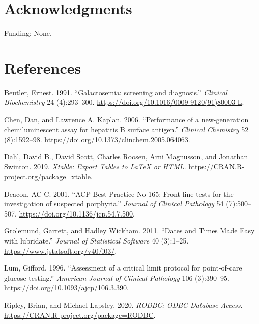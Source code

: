 \documentclass[review]{elsarticle}
\begin{document}
\section*{Acknowledgments}
\label{sec:orgf76cac3}
Funding: None.
\section*{References}
\label{sec:orgbd3db18}
\begin{hangparas}{1.5em}{1}
\hypertarget{citeproc_bib_item_1}{Beutler, Ernest. 1991. “Galactosemia: screening and diagnosis.” \textit{Clinical Biochemistry} 24 (4):293–300. \href{https://doi.org/10.1016/0009-9120(91)80003-L}{https://doi.org/10.1016/0009-9120(91)80003-L}.}

\hypertarget{citeproc_bib_item_2}{Chen, Dan, and Lawrence A. Kaplan. 2006. “Performance of a new-generation chemiluminescent assay for hepatitis B surface antigen.” \textit{Clinical Chemistry} 52 (8):1592–98. \href{https://doi.org/10.1373/clinchem.2005.064063}{https://doi.org/10.1373/clinchem.2005.064063}.}

\hypertarget{citeproc_bib_item_3}{Dahl, David B., David Scott, Charles Roosen, Arni Magnusson, and Jonathan Swinton. 2019. \textit{Xtable: Export Tables to LaTeX or HTML}. \href{https://CRAN.R-project.org/package=xtable}{https://CRAN.R-project.org/package=xtable}.}

\hypertarget{citeproc_bib_item_4}{Deacon, AC C. 2001. “ACP Best Practice No 165: Front line tests for the investigation of suspected porphyria.” \textit{Journal of Clinical Pathology} 54 (7):500–507. \href{https://doi.org/10.1136/jcp.54.7.500}{https://doi.org/10.1136/jcp.54.7.500}.}

\hypertarget{citeproc_bib_item_5}{Grolemund, Garrett, and Hadley Wickham. 2011. “Dates and Times Made Easy with lubridate.” \textit{Journal of Statistical Software} 40 (3):1–25. \href{https://www.jstatsoft.org/v40/i03/}{https://www.jstatsoft.org/v40/i03/}.}

\hypertarget{citeproc_bib_item_6}{Lum, Gifford. 1996. “Assessment of a critical limit protocol for point-of-care glucose testing.” \textit{American Journal of Clinical Pathology} 106 (3):390–95. \href{https://doi.org/10.1093/ajcp/106.3.390}{https://doi.org/10.1093/ajcp/106.3.390}.}

\hypertarget{citeproc_bib_item_7}{Ripley, Brian, and Michael Lapsley. 2020. \textit{RODBC: ODBC Database Access}. \href{https://CRAN.R-project.org/package=RODBC}{https://CRAN.R-project.org/package=RODBC}.}


\end{hangparas}
\end{document}
